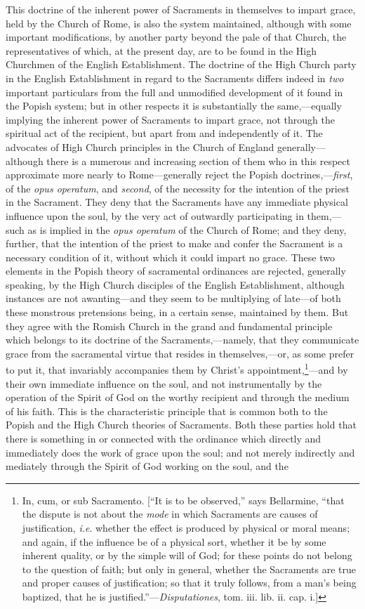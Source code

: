 \documentclass[english,]{book}
\begin{document}
This doctrine of the inherent power of Sacraments in themselves to impart grace, held by the Church of Rome, is also the system maintained, although with some important modifications, by another party beyond the pale of that Church, the representatives of which, at the present day, are to be found in the High Churchmen of the English Establishment. The doctrine of the High Church party in the English Establishment in regard to the Sacraments differs indeed in \emph{two} important particulars from the full and unmodified development of it found in the Popish system; but in other respects it is substantially the same,---equally implying the inherent power of Sacraments to impart grace, not through the spiritual act of the recipient, but apart from and independently of it. The advocates of High Church principles in the Church of England generally---although there is a numerous and increasing section of them who in this respect approximate more nearly to Rome---generally reject the Popish doctrines,---\emph{first}, of the \emph{opus operatum}, and \emph{second}, of the necessity for the intention of the priest in the Sacrament. They deny that the Sacraments have any immediate physical influence upon the soul, by the very act of outwardly participating in them,---such as is implied in the \emph{opus operatum} of the Church of Rome; and they deny, further, that the intention of the priest to make and confer the Sacrament is a necessary condition of it, without which it could impart no grace. These two elements in the Popish theory of sacramental ordinances are rejected, generally speaking, by the High Church disciples of the English Establishment, although instances are not awanting---and they seem to be multiplying of late---of both these monstrous pretensions being, in a certain sense, maintained by them. But they agree with the Romish Church in the grand and fundamental principle which belongs to its doctrine of the Sacraments,---namely, that they communicate grace from the sacramental virtue that resides in themselves,---or, as some prefer to put it, that invariably accompanies them by Christ's appointment,\footnote{In, cum, or sub Sacramento. {[}``It is to be observed,'' says Bellarmine, ``that the dispute is not about the \emph{mode} in which Sacraments are causes of justification, \emph{i.e}. whether the effect is produced by physical or moral means; and again, if the influence be of a physical sort, whether it be by some inherent quality, or by the simple will of God; for these points do not belong to the question of faith; but only in general, whether the Sacraments are true and proper causes of justification; so that it truly follows, from a man's being baptized, that he is justified.''---\emph{Disputationes}, tom. iii. lib. ii. cap. i.{]}}---and by their own immediate influence on the soul, and not instrumentally by the operation of the Spirit of God on the worthy recipient and through the medium of his faith. This is the characteristic principle that is common both to the Popish and the High Church theories of Sacraments. Both these parties hold that there is something in or connected with the ordinance which directly and immediately does the work of grace upon the soul; and not merely indirectly and mediately through the Spirit of God working on the soul, and the 
\end{document}
